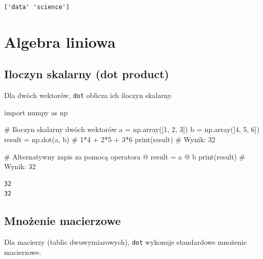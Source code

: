 \documentclass[
  polish,
  letterpaper,
  DIV=11,
  numbers=noendperiod]{scrreprt}
\newenvironment{Shaded}{\begin{snugshade}}{\end{snugshade}}
\newcommand{\BuiltInTok}[1]{\textcolor[rgb]{0.00,0.23,0.31}{#1}}
\newcommand{\CommentTok}[1]{\textcolor[rgb]{0.37,0.37,0.37}{#1}}
\newcommand{\DecValTok}[1]{\textcolor[rgb]{0.68,0.00,0.00}{#1}}
\newcommand{\ImportTok}[1]{\textcolor[rgb]{0.00,0.46,0.62}{#1}}
\newcommand{\NormalTok}[1]{\textcolor[rgb]{0.00,0.23,0.31}{#1}}
\newcommand{\OperatorTok}[1]{\textcolor[rgb]{0.37,0.37,0.37}{#1}}
\begin{document}
\begin{verbatim}
['data' 'science']
\end{verbatim}

\chapter{Algebra liniowa}\label{algebra-liniowa}

\section{Iloczyn skalarny (dot
product)}\label{iloczyn-skalarny-dot-product}

Dla dwóch wektorów, \texttt{dot} oblicza ich iloczyn skalarny.

\begin{Shaded}
\begin{Highlighting}[]
\ImportTok{import}\NormalTok{ numpy }\ImportTok{as}\NormalTok{ np}

\CommentTok{\# Iloczyn skalarny dwóch wektorów}
\NormalTok{a }\OperatorTok{=}\NormalTok{ np.array([}\DecValTok{1}\NormalTok{, }\DecValTok{2}\NormalTok{, }\DecValTok{3}\NormalTok{])}
\NormalTok{b }\OperatorTok{=}\NormalTok{ np.array([}\DecValTok{4}\NormalTok{, }\DecValTok{5}\NormalTok{, }\DecValTok{6}\NormalTok{])}
\NormalTok{result }\OperatorTok{=}\NormalTok{ np.dot(a, b)  }\CommentTok{\# 1*4 + 2*5 + 3*6}
\BuiltInTok{print}\NormalTok{(result)  }\CommentTok{\# Wynik: 32}

\CommentTok{\# Alternatywny zapis za pomocą operatora @}
\NormalTok{result }\OperatorTok{=}\NormalTok{ a }\OperatorTok{@}\NormalTok{ b}
\BuiltInTok{print}\NormalTok{(result)  }\CommentTok{\# Wynik: 32}
\end{Highlighting}
\end{Shaded}

\begin{verbatim}
32
32
\end{verbatim}

\section{Mnożenie macierzowe}\label{mnoux17cenie-macierzowe}

Dla macierzy (tablic dwuwymiarowych), \texttt{dot} wykonuje standardowe
mnożenie macierzowe.
\end{document}
